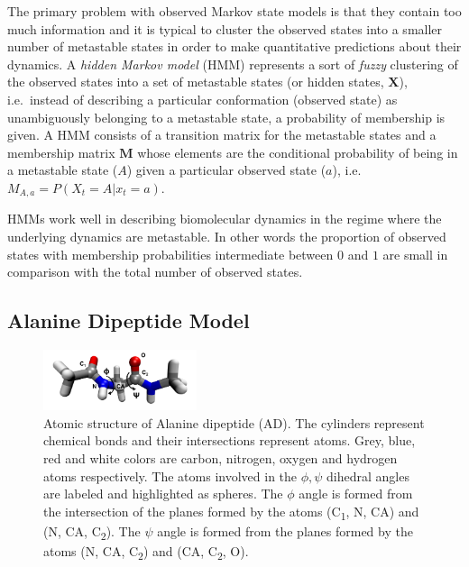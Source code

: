 \documentclass[a4paper,10pt,oneside]{article}
\begin{document}
\begin{sloppy}
The primary problem with observed Markov state models is that they contain too much information and it is typical to cluster the observed states into a smaller number of metastable states in order to make quantitative predictions about their dynamics. A \emph{hidden Markov model} (HMM) represents a sort of \emph{fuzzy} clustering of the observed states into  a set of metastable states (or hidden states, $\mathbf{X}$), i.e.\ instead of describing a particular conformation (observed state) as unambiguously belonging to a metastable state, a probability of membership is given. A HMM consists of a transition matrix for the  metastable states and a membership matrix $\mathbf{M}$ whose elements are the conditional probability of being in a metastable state ($A$) given a particular observed state ($a$), i.e.\ $M_{A,a} = P(X_{t} = A | x_{t} = a )$.

HMMs work well in describing biomolecular dynamics in the regime where the underlying dynamics are metastable.  In other words the proportion of observed states with membership probabilities intermediate between $0$ and $1$ are small in comparison with the total number of observed states. 

\subsection{Alanine Dipeptide Model}
\begin{figure}
\includegraphics[width=0.4\textwidth]{./phi_psi_ala-dp.png}
\caption{Atomic structure of Alanine dipeptide (AD). The cylinders represent chemical bonds and their intersections represent atoms. Grey, blue, red and white colors are carbon, nitrogen, oxygen and hydrogen atoms respectively. The atoms involved in the $\phi, \psi$ dihedral angles are labeled and highlighted as spheres.  The $\phi$ angle is formed from the intersection of the planes formed by the atoms (C\textsubscript{1}, N, CA) and (N, CA, C\textsubscript{2}).  The $\psi$ angle is formed from the planes formed by the atoms (N, CA, C\textsubscript{2}) and (CA, C\textsubscript{2}, O).}\label{fig:ala2}
\end{figure}


\end{sloppy}
\end{document}
